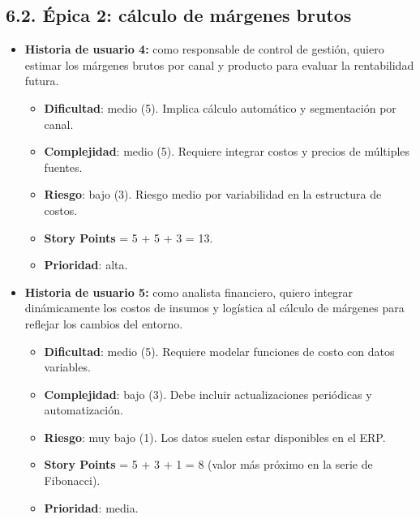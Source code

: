 \documentclass[
11pt, %
]{charter}
\begin{document}
\subsection*{6.2. Épica 2: cálculo de márgenes brutos}
\begin{itemize}
  \item \textbf{Historia de usuario 4:} como responsable de control de gestión, quiero estimar los márgenes brutos por canal y producto para evaluar la rentabilidad futura.
    \begin{itemize}
      \item \textbf{Dificultad}: medio (5). Implica cálculo automático y segmentación por canal.
      \item \textbf{Complejidad}: medio (5). Requiere integrar costos y precios de múltiples fuentes.
      \item \textbf{Riesgo}: bajo (3). Riesgo medio por variabilidad en la estructura de costos.
      \item \textbf{Story Points} = 5 + 5 + 3 = 13.
      \item \textbf{Prioridad}: alta.
    \end{itemize}
  \item \textbf{Historia de usuario 5:} como analista financiero, quiero integrar dinámicamente los costos de insumos y logística al cálculo de márgenes para reflejar los cambios del entorno.
    \begin{itemize}
      \item \textbf{Dificultad}: medio (5). Requiere modelar funciones de costo con datos variables.
      \item \textbf{Complejidad}: bajo (3). Debe incluir actualizaciones periódicas y automatización.
      \item \textbf{Riesgo}: muy bajo (1). Los datos suelen estar disponibles en el ERP.
      \item \textbf{Story Points} = 5 + 3 + 1 = 8 (valor más próximo en la serie de Fibonacci).
      \item \textbf{Prioridad}: media.
    \end{itemize}
\end{itemize}
\end{document}
